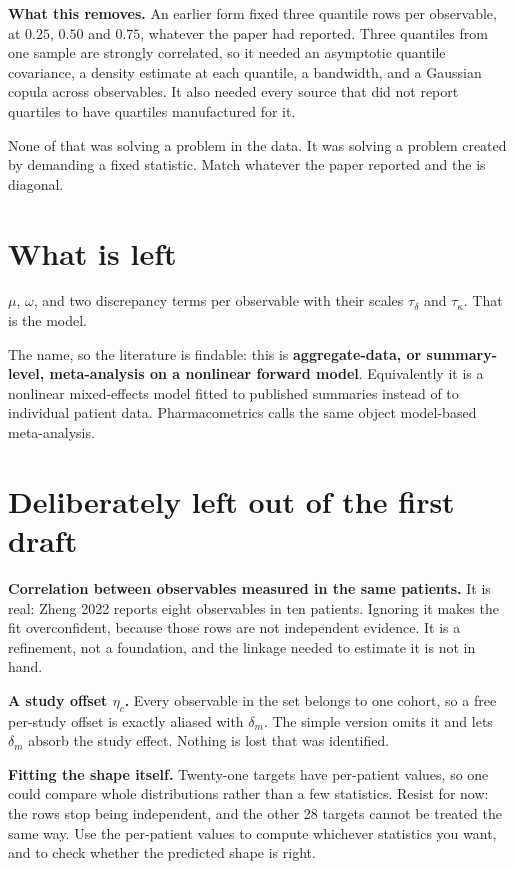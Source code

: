 \documentclass[11pt]{article}
\begin{document}
\begin{notebox}
\textbf{What this removes.} An earlier form fixed three quantile rows per
observable, at $0.25$, $0.50$ and $0.75$, whatever the paper had reported. Three
quantiles from one sample are strongly correlated, so it needed an asymptotic
quantile covariance, a density estimate at each quantile, a bandwidth, and a
Gaussian copula across observables. It also needed every source that did not
report quartiles to have quartiles manufactured for it.

None of that was solving a problem in the data. It was solving a problem created
by demanding a fixed statistic. Match whatever the paper reported and the
is diagonal.
\end{notebox}

\section{What is left}

$\mu$, $\omega$, and two discrepancy terms per observable with their scales
$\tau_\delta$ and $\tau_\kappa$. That is the model.

The name, so the literature is findable: this is \textbf{aggregate-data, or
summary-level, meta-analysis on a nonlinear forward model}. Equivalently it is a
nonlinear mixed-effects model fitted to published summaries instead of to
individual patient data. Pharmacometrics calls the same object model-based
meta-analysis.

\section{Deliberately left out of the first draft}

\textbf{Correlation between observables measured in the same patients.} It is
real: Zheng 2022 reports eight observables in ten patients. Ignoring it makes the
fit overconfident, because those rows are not independent evidence. It is a
refinement, not a foundation, and the linkage needed to estimate it is not in
hand.

\textbf{A study offset $\eta_c$.} Every observable in the set belongs to one
cohort, so a free per-study offset is exactly aliased with $\delta_m$. The simple
version omits it and lets $\delta_m$ absorb the study effect. Nothing is lost
that was identified.

\textbf{Fitting the shape itself.} Twenty-one targets have per-patient values,
so one could compare whole distributions rather than a few statistics. Resist for
now: the rows stop being independent, and the other 28 targets cannot be treated
the same way. Use the per-patient values to compute whichever statistics you
want, and to check whether the predicted shape is right.
\end{document}
